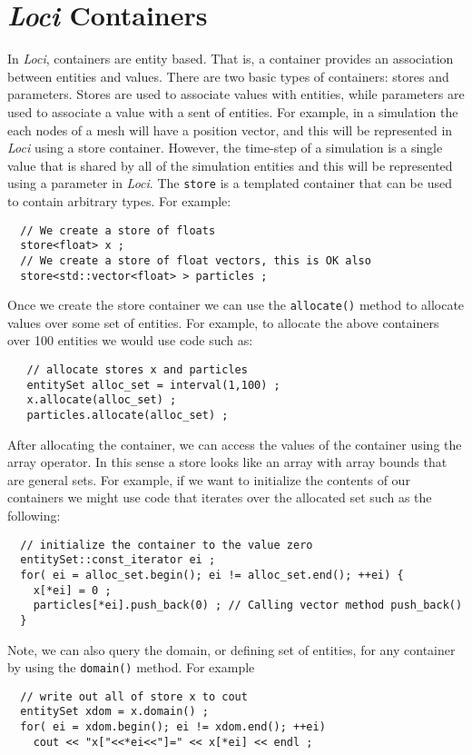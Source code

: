 \documentclass[10pt,epsf,letterpaper,twoside]{book}
\begin{document}


\section{{\it Loci} Containers}

In {\it Loci}, containers are entity based.  That is, a container provides
an association between entities and values.  There are two basic types
of containers: stores and parameters.  Stores are used to associate
values with entities, while parameters are used to associate a value
with a sent of entities.  For example, in a simulation the each nodes
of a mesh will have a position vector, and this will be represented in
{\it Loci} using a store container.  However, the time-step of a simulation
is a single value that is shared by all of the simulation entities and
this will be represented using a parameter in {\it Loci}.  The {\tt store} is a
templated container that can be used to contain arbitrary types.  For
example:
\begin{verbatim}
  // We create a store of floats
  store<float> x ;
  // We create a store of float vectors, this is OK also
  store<std::vector<float> > particles ;
\end{verbatim}

Once we create the store container we can use the {\tt allocate()}
method to allocate values over some set of entities.  For example, to
allocate the above containers over 100 entities we would use code such
as:
\begin{verbatim}
   // allocate stores x and particles
   entitySet alloc_set = interval(1,100) ;
   x.allocate(alloc_set) ;
   particles.allocate(alloc_set) ;
\end{verbatim}

After allocating the container, we can access the values of the
container using the array operator.  In this sense a store looks like
an array with array bounds that are general sets.  For example, if we
want to initialize the contents of our containers we might use code
that iterates over the allocated set such as the following:
\begin{verbatim}
  // initialize the container to the value zero
  entitySet::const_iterator ei ;
  for( ei = alloc_set.begin(); ei != alloc_set.end(); ++ei) {
    x[*ei] = 0 ;
    particles[*ei].push_back(0) ; // Calling vector method push_back()
  }
\end{verbatim}

Note, we can also query the domain, or defining set of entities, for any container by using the {\tt domain()} method.  For example
\begin{verbatim}
  // write out all of store x to cout
  entitySet xdom = x.domain() ;
  for( ei = xdom.begin(); ei != xdom.end(); ++ei) 
    cout << "x["<<*ei<<"]=" << x[*ei] << endl ;
\end{verbatim}
\end{document}
